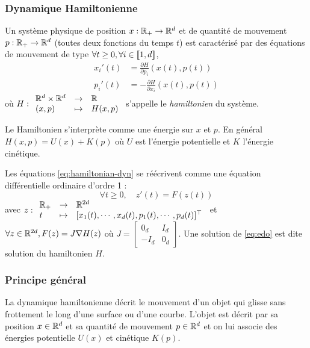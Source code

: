 \documentclass[10pt,a4paper]{article}
\begin{document}
\subsubsection{Dynamique Hamiltonienne}

Un système physique de position $x : \mathbb{R}_+ \to \mathbb{R}^d$ et de quantité de mouvement $p : \mathbb{R}_+ \to \mathbb{R}^d$ (toutes deux fonctions du temps $t$) est caractérisé par des équations de mouvement de type $\forall t \geq 0, \forall i \in {\left\llbracket 1,d \right\rrbracket}$, 
\begin{equation}\label{eq:hamiltonian-dyn}
	\begin{aligned}
		x_i'(t) &= \frac{\partial H}{\partial p_i} (x(t), p(t)) \\
		p_i' (t) &= -\frac{\partial H}{\partial x_i} (x(t), p(t))
	\end{aligned}
\end{equation}
où $H : { \begin{array}{lcl} \mathbb{R}^d \times \mathbb{R}^d & \to & \mathbb{R} \\ (x,p) & \mapsto & H(x,p) \end{array} }$ s'appelle le {\it hamiltonien} du système.

Le Hamiltonien s'interprète comme une énergie sur $x$ et $p$. En général $H(x,p) = U(x) + K(p)$ où $U$ est l'énergie potentielle et $K$ l'énergie cinétique.

\begin{Rque}\label{rque:edo}
	Les équations \eqref{eq:hamiltonian-dyn} se réécrivent comme une équation différentielle ordinaire d'ordre 1 :
	\begin{equation}\label{eq:edo}
		\forall t \geq 0, \quad z'(t) = F(z(t))
		\tag{EDO}
	\end{equation}
	avec $z : { \begin{array}{lcl}  \mathbb{R}_+ & \to & \mathbb{R}^{2d} \\ t & \mapsto & [x_1(t), \cdots, x_d(t), p_1(t), \cdots, p_d(t)]^\top \end{array} }$ et $\forall z \in \mathbb{R}^{2d}, F(z) = J \nabla H (z)$ où
	$J = \begin{bmatrix}
		0_{d} & I_{d} \\
		-I_{d} & 0_{d}
	\end{bmatrix}$.
	Une solution de \eqref{eq:edo} est dite solution du hamiltonien $H$.
\end{Rque}

\subsubsection{Principe général}

La dynamique hamiltonienne décrit le mouvement d'un objet qui glisse sans frottement le long d'une surface ou d'une courbe. L'objet est décrit par sa position $x \in \mathbb{R}^d$ et sa quantité de mouvement $p \in \mathbb{R}^d$ et on lui associe des énergies potentielle $U(x)$ et cinétique $K(p)$.
\end{document}
